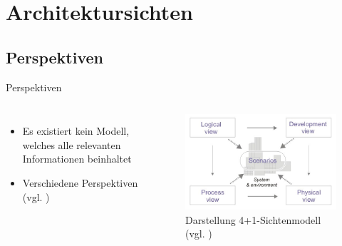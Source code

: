 \documentclass{beamer}
\begin{document}
		\section{Architektursichten}
		\subsection{Perspektiven}
			\begin{frame}{Perspektiven}
				\begin{columns}
				\begin{itemize}
					\item Es existiert kein Modell, welches alle relevanten Informationen beinhaltet
					\item Verschiedene Perspektiven (vgl. \cite{4+1})
				\end{itemize}
			   	\begin{figure}
					\includegraphics[width=\textwidth]{4+1.jpg}
					\caption{Darstellung 4+1-Sichtenmodell (vgl. \cite{4+1pic})}
				\end{figure}
			\end{columns}
			\end{frame}
\end{document}
